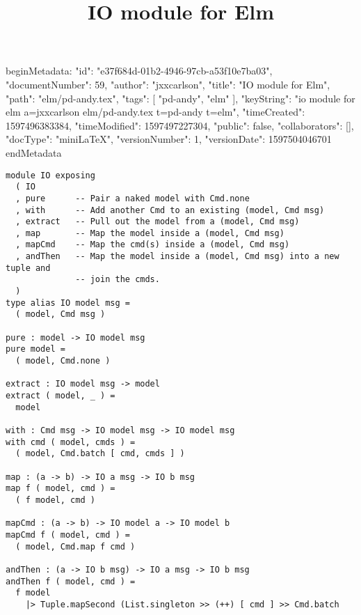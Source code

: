 beginMetadata:
{
    "id": "e37f684d-01b2-4946-97cb-a53f10e7ba03",
    "documentNumber": 59,
    "author": "jxxcarlson",
    "title": "IO module for Elm",
    "path": "elm/pd-andy.tex",
    "tags": [
        "pd-andy",
        "elm"
    ],
    "keyString": "io module for elm a=jxxcarlson elm/pd-andy.tex t=pd-andy t=elm",
    "timeCreated": 1597496383384,
    "timeModified": 1597497227304,
    "public": false,
    "collaborators": [],
    "docType": "miniLaTeX",
    "versionNumber": 1,
    "versionDate": 1597504046701
}
endMetadata\title{IO module for Elm}

\maketitle 


\begin{verbatim}
module IO exposing
  ( IO
  , pure      -- Pair a naked model with Cmd.none
  , with      -- Add another Cmd to an existing (model, Cmd msg)
  , extract   -- Pull out the model from a (model, Cmd msg)
  , map       -- Map the model inside a (model, Cmd msg)
  , mapCmd    -- Map the cmd(s) inside a (model, Cmd msg)
  , andThen   -- Map the model inside a (model, Cmd msg) into a new tuple and
              -- join the cmds.
  )
type alias IO model msg =
  ( model, Cmd msg )

pure : model -> IO model msg
pure model =
  ( model, Cmd.none )

extract : IO model msg -> model
extract ( model, _ ) =
  model

with : Cmd msg -> IO model msg -> IO model msg
with cmd ( model, cmds ) =
  ( model, Cmd.batch [ cmd, cmds ] )

map : (a -> b) -> IO a msg -> IO b msg
map f ( model, cmd ) =
  ( f model, cmd )

mapCmd : (a -> b) -> IO model a -> IO model b
mapCmd f ( model, cmd ) =
  ( model, Cmd.map f cmd )

andThen : (a -> IO b msg) -> IO a msg -> IO b msg
andThen f ( model, cmd ) =
  f model
    |> Tuple.mapSecond (List.singleton >> (++) [ cmd ] >> Cmd.batch

\end{verbatim}